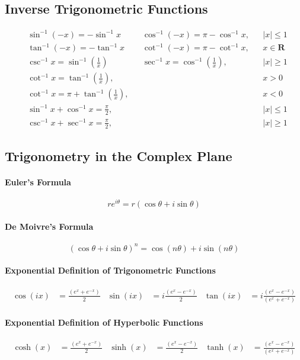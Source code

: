 \subsection{Inverse Trigonometric Functions}
\begin{align*}
	&\sin^{-1}(-x) =-\sin^{-1}x &   &\cos^{-1}(-x) =\pi-\cos^{-1}x, & &\lvert x\rvert\leq 1 \\
	&\tan^{-1}(-x) =-\tan^{-1}x &   &\cot^{-1}(-x) =\pi-\cot^{-1}x,& &x\in\mathbf{R} \\
	&\csc^{-1}x =\sin^{-1}\left(\frac{1}{x}\right) & &\sec^{-1}x =\cos^{-1}\left(\frac{1}{x}\right),& &\lvert x\rvert\geq1 \\ &\cot^{-1}x =\tan^{-1}\left(\frac{1}{x}\right),& & & &x>0 \\
	&\cot^{-1}x =\pi+\tan^{-1}\left(\frac{1}{x}\right),& & & &x<0 \\
	&\sin^{-1}x+\cos^{-1}x =\frac{\pi}{2},& & &  &\lvert x\rvert\leq1 \\
	&\csc^{-1}x+\sec^{-1}x =\frac{\pi}{2},& & & &\lvert x\rvert\geq1
\end{align*}

\subsection{Trigonometry in the Complex Plane}
\paragraph{Euler's Formula}
$$re^{i\theta} = r(\cos\theta + i\sin\theta)$$
\paragraph{De Moivre's Formula}
$${(\cos\theta + i\sin\theta)}^n = \cos{(n\theta)} + i\sin{(n\theta)}$$
\paragraph{Exponential Definition of Trigonometric Functions}
\begin{align*}
\cos{(ix)} &= \frac{(e^x + e^{-x})}{2} & \sin{(ix)} &= i\frac{(e^x - e^{-x})}{2} & \tan{(ix)} &= i\frac{(e^x - e^{-x})}{(e^x + e^{-x})}
\end{align*}
\paragraph{Exponential Definition of Hyperbolic Functions}
\begin{align*}
\cosh{(x)} &= \frac{(e^x + e^{-x})}{2} & \sinh{(x)} &= \frac{(e^x - e^{-x})}{2} & \tanh{(x)} &= \frac{(e^x - e^{-x})}{(e^x + e^{-x})}
\end{align*}
